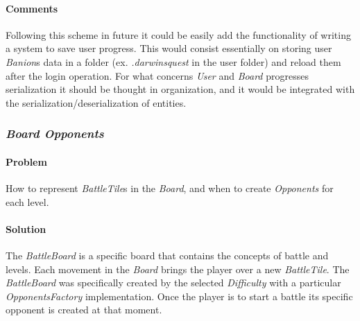 \documentclass[12pt, a4paper]{report}
\theoremstyle{definition}
\begin{document}
            \paragraph{Comments}

            Following this scheme in future it could be easily add the functionality of writing a system to save user progress.
            This would consist essentially on storing user \emph{Banion}s data in a folder (ex. \emph{.darwinsquest} in the user folder) and reload them after the login operation.
            For what concerns \emph{User} and \emph{Board} progresses serialization it should be thought in organization, and it would be integrated with the serialization/deserialization of entities.

        \pagebreak

        \subsubsection{\emph{Board Opponents}}

            \paragraph{Problem}

            How to represent \emph{BattleTile}s in the \emph{Board}, and when to create \emph{Opponents} for each level.

            \paragraph{Solution}

            The \emph{BattleBoard} is a specific board that contains the concepts of battle and levels.
            Each movement in the \emph{Board} brings the player over a new \emph{BattleTile}.
            The \emph{BattleBoard} was specifically created by the selected \emph{Difficulty} with a particular \emph{OpponentsFactory} implementation.
            Once the player is to start a battle its specific opponent is created at that moment.
\end{document}
